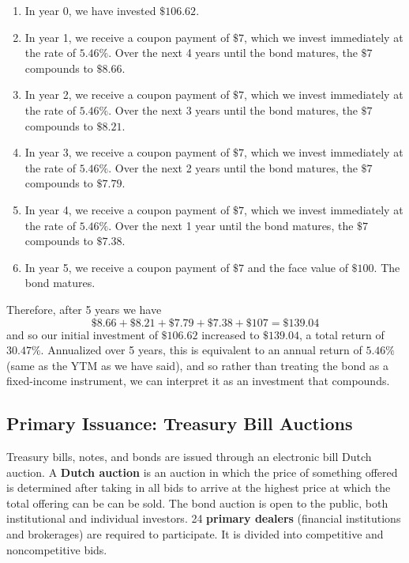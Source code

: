\documentclass{article}
\begin{document}
    \begin{enumerate}
      \item In year 0, we have invested $\$106.62$.
      \item In year 1, we receive a coupon payment of $\$7$, which we invest immediately at the rate of $5.46\%$. Over the next 4 years until the bond matures, the $\$7$ compounds to $\$8.66$.
      \item In year 2, we receive a coupon payment of $\$7$, which we invest immediately at the rate of $5.46\%$. Over the next 3 years until the bond matures, the $\$7$ compounds to $\$8.21$.
      \item In year 3, we receive a coupon payment of $\$7$, which we invest immediately at the rate of $5.46\%$. Over the next 2 years until the bond matures, the $\$7$ compounds to $\$7.79$.
      \item In year 4, we receive a coupon payment of $\$7$, which we invest immediately at the rate of $5.46\%$. Over the next 1 year until the bond matures, the $\$7$ compounds to $\$7.38$.
      \item In year 5, we receive a coupon payment of $\$7$ and the face value of $\$100$. The bond matures.
    \end{enumerate}

    Therefore, after 5 years we have
    \begin{equation}
      \$8.66+\$8.21 + \$7.79 + \$7.38 + \$107 = \$139.04
    \end{equation}
    and so our initial investment of $\$106.62$ increased to $\$139.04$, a total return of $30.47\%$. Annualized over 5 years, this is equivalent to an annual return of $5.46\%$ (same as the YTM as we have said), and so rather than treating the bond as a fixed-income instrument, we can interpret it as an investment that compounds.

  \subsection{Primary Issuance: Treasury Bill Auctions}

    Treasury bills, notes, and bonds are issued through an electronic bill Dutch auction. A \textbf{Dutch auction} is an auction in which the price of something offered is determined after taking in all bids to arrive at the highest price at which the total offering can be can be sold. The bond auction is open to the public, both institutional and individual investors. 24 \textbf{primary dealers} (financial institutions and brokerages) are required to participate. It is divided into competitive and noncompetitive bids.
\end{document}
